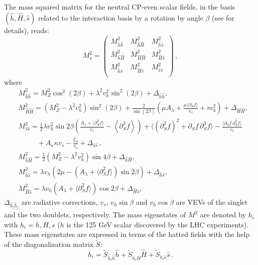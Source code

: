 \documentclass[12pt,twoside]{article}
\def\pa{\partial}
\def\hathh{\hat{h}\hat{h}}
\def\hatHH{\hat{H}\hat{H}}
\def\hatss{\hat{s}\hat{s}}
\def\hathH{\hat{h}\hat{H}}
\def\haths{\hat{h}\hat{s}}
\def\hatHs{\hat{H}\hat{s}}
\begin{document}
The mass squared matrix for the neutral CP-even scalar fields, 
in the basis $\left(\hat{h}, \hat{H}, \hat{s}\right)$ 
related to the interaction basis by a rotation by angle $\beta$ 
(see \cite{BS_NMSSM} for details), reads:
%
\begin{equation}
\label{M_s^2}
 {M}_s^2=
\left(
\begin{array}{ccc}
  {M}^2_{\hathh} & {M}^2_{\hathH} & {M}^2_{\haths} \\[4pt]
   {M}^2_{\hathH} & {M}^2_{\hatHH} & {M}^2_{\hatHs} \\[4pt]
   {M}^2_{\haths} & {M}^2_{\hatHs} & {M}^2_{\hatss} \\
\end{array}
\right) \,,
\end{equation}
%
where
%
\begin{align}
\label{Mhh}
 &{M}^2_{\hathh} = M_Z^2\cos^2\left(2\beta\right)
+ \lambda^2 v_h^2\sin^2\left(2\beta\right) 
+\Delta_{\hathh}, \\
\label{MHH}
&{M}^2_{\hatHH} = (M_Z^2-\lambda^2 v_h^2)\sin^2\left(2\beta\right) 
+ 
\frac{2}{\sin\left(2\beta\right)}
\left(\mu A_{\lambda} + 
\frac{\mu\langle\pa_S f\rangle}{v_s}
+m_3^2\right)+\Delta_{\hatHH}, 
\\
\label{Mss}
&{M}^2_{\hatss} =  
\frac12 \lambda v_h^2 \sin2\beta
\left(\frac{A_{\lambda}+\langle\pa_S^2 f\rangle}{v_s}-\left<\partial^3_Sf\right>\right)
+\langle(\partial_S^2f)^2 + \partial_S f\,\partial_S^3 f\rangle
-\frac{\langle\partial_S f\,\partial_S^2 f\rangle}{v_s}
\nonumber\\ &\hspace{32pt}
+A_\kappa\kappa v_s -\frac{\xi_S}{v_s}
+\Delta_{\hatss}\,, \\
\label{MhH}
& {M}^2_{\hathH} = \frac{1}{2}(M^2_Z-\lambda^2 v_h^2)\sin4\beta
+\Delta_{\hathH}, \\
\label{Mhs}
& {M}^2_{\haths} =  
\lambda v_h (2\mu- \left(A_{\lambda}+\langle\pa_S^2 f\rangle\right) \sin2\beta)
+\Delta_{\haths}, \\
\label{MHs}
& {M}^2_{\hatHs} =
 \lambda v_h \left(A_{\lambda}+\langle\pa_S^2 f\rangle\right) \cos2\beta
+\Delta_{\hatHs} ,
\end{align}
%
%
$\Delta_{{\hat{h}_i}\hat{h}_j}$ are radiative corrections,
$v_s$, $v_h\sin\beta$ and $v_h\cos\beta$ are VEVs of the singlet 
and the two doublets, respectively.
The mass eigenstates of ${M}^2$ are
denoted by $h_i$ with $h_i=h,H,s$
($h$ is the 125 GeV scalar discovered by the LHC 
experiments). These mass eigenstates 
are expressed in terms of the hatted fields with the help of the 
diagonalization matrix $\tilde{S}$:
%
\begin{equation}
\label{tildeS}
h_i
=\tilde{S}_{h_i\hat{h}}\hat{h}
+\tilde{S}_{h_i\hat{H}}\hat{H}
+\tilde{S}_{h_i\hat{s}}\hat{s}
\,.
\end{equation}
%
\end{document}
